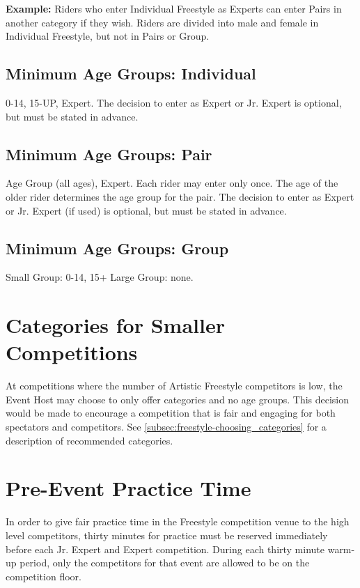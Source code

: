 \textbf{Example:} Riders who enter Individual Freestyle as Experts can enter Pairs in another category if they wish.
Riders are divided into male and female in Individual Freestyle, but not in Pairs or Group.

\subsection{Minimum Age Groups: Individual}
 0-14, 15-UP, Expert.
The decision to enter as Expert or Jr. Expert is optional, but must be stated in advance.

\subsection{Minimum Age Groups: Pair}

Age Group (all ages), Expert.
Each rider may enter only once.
The age of the older rider determines the age group for the pair.
The decision to enter as Expert or Jr. Expert (if used) is optional, but must be stated in advance.

\subsection{Minimum Age Groups: Group}

Small Group: 0-14, 15+
Large Group: none.

\section{Categories for Smaller Competitions}
At competitions where the number of Artistic Freestyle competitors is low, the Event Host may choose to only offer categories and no age groups.
This decision would be made to encourage a competition that is fair and engaging for both spectators and competitors.
See \ref{subsec:freestyle-choosing_categories} for a description of recommended categories.

\section{Pre-Event Practice Time}
In order to give fair practice time in the Freestyle competition venue to the high level competitors, thirty minutes for practice must be reserved immediately before each Jr. Expert and Expert competition.
During each thirty minute warm-up period, only the competitors for that event are allowed to be on the competition floor.

